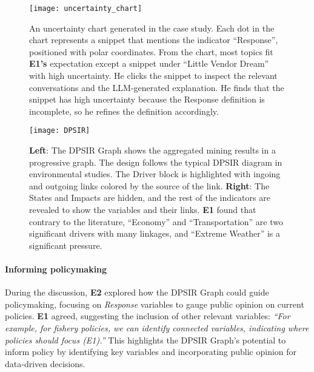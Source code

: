 \begin{figure}[]
     \centering
    \texttt{[image: uncertainty\_chart]}
    \caption{An uncertainty chart generated in the case study.
    Each dot in the chart represents a snippet that mentions the indicator ``Response'', positioned with polar coordinates. 
    From the chart, most topics fit \textbf{E1's} expectation except a snippet under ``Little Vendor Dream'' with high uncertainty. He clicks the snippet to inspect the relevant conversations and the LLM-generated explanation. 
    He finds that the snippet has high uncertainty because the Response definition is incomplete, 
    so he refines the definition accordingly. 
    }
    \label{fig: uncertainty_chart}
  \vspace*{-0.6cm}
\end{figure}

\begin{figure*}[t]
    \centering
    \texttt{[image: DPSIR]}
    \caption{\textbf{Left}: The DPSIR Graph shows the aggregated mining results in a progressive graph. The design follows the typical DPSIR diagram in environmental studies. The Driver block is highlighted with ingoing and outgoing links colored by the source of the link. \textbf{Right}: The States and Impacts are hidden, and the rest of the indicators are revealed to show the variables and their links. \textbf{E1} found that contrary to the literature, ``Economy'' and ``Transportation'' are two significant drivers with many linkages, and ``Extreme Weather'' is a significant pressure. }
    \label{fig: DPSIR}
    \vspace*{-0.5cm}
\end{figure*}

\vspace*{-0.15cm}
\paragraph{Informing policymaking}
During the discussion, \textbf{E2} explored how the DPSIR Graph could guide policymaking, focusing on \textit{Response} variables to gauge public opinion on current policies. \textbf{E1} agreed, suggesting the inclusion of other relevant variables: \textit{``For example, for fishery policies, we can identify connected variables, indicating where policies should focus ({E1}).''} This highlights the DPSIR Graph’s potential to inform policy by identifying key variables and incorporating public opinion for data-driven decisions.

